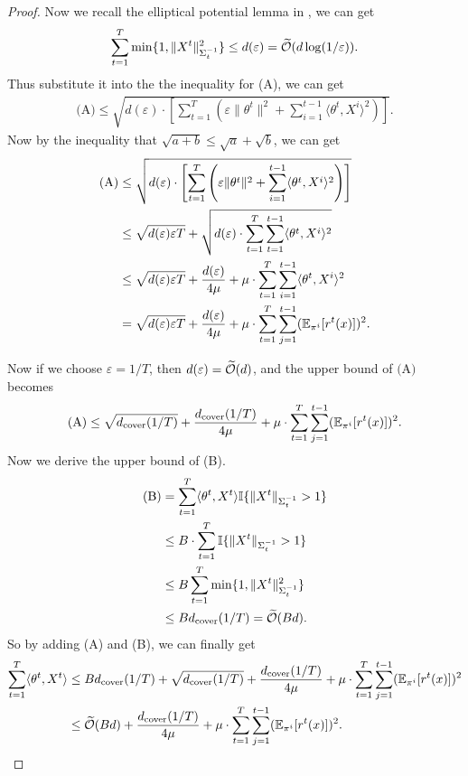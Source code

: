 \begin{proof}
 
    Now we recall the elliptical potential lemma in \citep{abbasi2011improved}, we can get 
\begin{align}
    \sum_{t=1}^T \min\{1,\|X^t\|^2_{\Sigma_t^{-1}}\}\le d(\varepsilon) = \widetilde{\mathcal{O}}(d\log(1/\varepsilon)).\label{ineq:eplemma}
\end{align}
Thus substitute it into the the inequality for (A), we can get 
\begin{align*}
    \textrm{(A)} \le \sqrt{d(\varepsilon)\cdot \left[\sum_{t=1}^T\left(\varepsilon\|\theta^t\|^2 + \sum_{i=1}^{t-1}\langle \theta^t, X^i\rangle ^2\right)\right]}.
\end{align*}
Now by the inequality that $\sqrt{a+b} \le \sqrt{a} + \sqrt{b}$,  we can get 
\begin{align*}
    \textrm{(A)} &\le \sqrt{d(\varepsilon)\cdot \left[\sum_{t=1}^T\left(\varepsilon\|\theta^t\|^2 + \sum_{i=1}^{t-1}\langle \theta^t, X^i\rangle ^2\right)\right]}\\
    &\le \sqrt{d(\varepsilon)\varepsilon T} + \sqrt{d(\varepsilon)\cdot \sum_{t=1}^T \sum_{t=1}^{t-1}\langle \theta^t, X^i\rangle^2}\\
    & \le \sqrt{d(\varepsilon)\varepsilon T} + \frac{d(\varepsilon)}{4\mu} + \mu \cdot \sum_{t=1}^T \sum_{i=1}^{t-1}\langle \theta^t, X^i\rangle^2\\
    & = \sqrt{d(\varepsilon)\varepsilon T} + \frac{d(\varepsilon)}{4\mu} + \mu \cdot \sum_{t=1}^T \sum_{j=1}^{t-1} (\mathbb{E}_{\pi^i}[r^t(x)])^2.
    \end{align*}

    Now if we choose $\varepsilon=1/T$, then $d(\varepsilon) = \widetilde{\mathcal{O}}(d)$, and the upper bound of $\textrm{(A)}$ becomes
    \begin{align*}
        \textrm{(A)} \le \sqrt{d_{\mathrm{cover}}(1/T)}+\frac{d_{\mathrm{cover}}(1/T)}{4\mu} + \mu \cdot \sum_{t=1}^T \sum_{j=1}^{t-1} (\mathbb{E}_{\pi^i}[r^t(x)])^2.
    \end{align*}
    Now we derive the upper bound of (B).
    \begin{align*}
        \textrm{(B)}& = \sum_{t=1}^T\langle \theta^t, X^t\rangle \mathbb{I}\{\|X^t\|_{\Sigma_t^{-1}}>1\}\\
        &\le B\cdot \sum_{t=1}^T\mathbb{I}\{\|X^t\|_{\Sigma_t^{-1}}>1\}\\
        &\le B \sum_{t=1}^T \min\{1,\|X^t\|_{\Sigma_t^{-1}}^2\}\\
        &\le B d_{\mathrm{cover}}(1/T) = \widetilde{\mathcal{O}}(Bd).
    \end{align*}
    So by adding (A) and (B), we can finally get 
    \begin{align*}
        \sum_{t=1}^T \langle \theta^t, X^t \rangle &\le Bd_{\mathrm{cover}}(1/T) + \sqrt{d_{\mathrm{cover}}(1/T)} +  \frac{d_{\mathrm{cover}}(1/T)}{4\mu} + \mu \cdot \sum_{t=1}^T \sum_{j=1}^{t-1} (\mathbb{E}_{\pi^i}[r^t(x)])^2\\
        &\le \widetilde{\mathcal{O}}(Bd) +  \frac{d_{\mathrm{cover}}(1/T)}{4\mu} + \mu \cdot \sum_{t=1}^T \sum_{j=1}^{t-1} (\mathbb{E}_{\pi^i}[r^t(x)])^2.
    \end{align*}



\end{proof}

